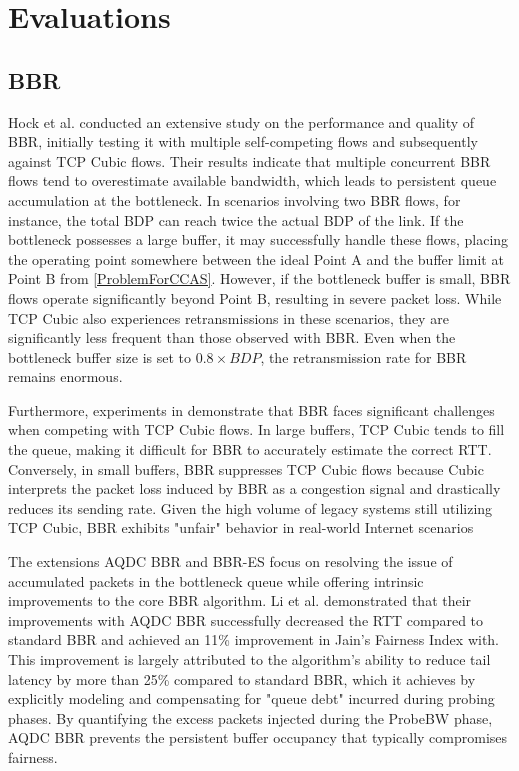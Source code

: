 \section{Evaluations}\label{sec:Evaluation}

\subsection{BBR}

Hock et al. \cite{BBREVALUATION} conducted an extensive study on the performance and quality of BBR, initially testing it with multiple self-competing flows and subsequently against TCP Cubic flows. 
Their results indicate that multiple concurrent BBR flows tend to overestimate available bandwidth, which leads to persistent queue accumulation at the bottleneck. 
In scenarios involving two BBR flows, for instance, the total BDP can reach twice the actual BDP of the link.  
If the bottleneck possesses a large buffer, it may successfully handle these flows, placing the operating point somewhere between the ideal Point A and the buffer limit at Point B from \ref{ProblemForCCAS}. 
However, if the bottleneck buffer is small, BBR flows operate significantly beyond Point B, resulting in severe packet loss. 
While TCP Cubic also experiences retransmissions in these scenarios, they are significantly less frequent than those observed with BBR. 
Even when the bottleneck buffer size is set to $0.8 \times BDP$, the retransmission rate for BBR remains enormous\cite{BBREVALUATION}.

Furthermore, experiments in \cite{BBREVALUATION} demonstrate that BBR faces significant challenges when competing with TCP Cubic flows. 
In large buffers, TCP Cubic tends to fill the queue, making it difficult for BBR to accurately estimate the correct RTT. 
Conversely, in small buffers, BBR suppresses TCP Cubic flows because Cubic interprets the packet loss induced by BBR as a congestion signal and drastically reduces its sending rate. 
Given the high volume of legacy systems still utilizing TCP Cubic, BBR exhibits "unfair" behavior in real-world Internet scenarios

The extensions AQDC BBR and BBR-ES focus on resolving the issue of accumulated packets in the bottleneck queue while offering intrinsic improvements to the core BBR algorithm.
Li et al. demonstrated that their improvements with AQDC BBR successfully decreased the RTT compared to standard BBR and achieved an 11\% improvement in Jain's Fairness Index with. 
This improvement is largely attributed to the algorithm's ability to reduce tail latency by more than 25\% compared to standard BBR, which it achieves by explicitly modeling and compensating for "queue debt" incurred during probing phases. 
By quantifying the excess packets injected during the ProbeBW phase, AQDC BBR prevents the persistent buffer occupancy that typically compromises fairness.

